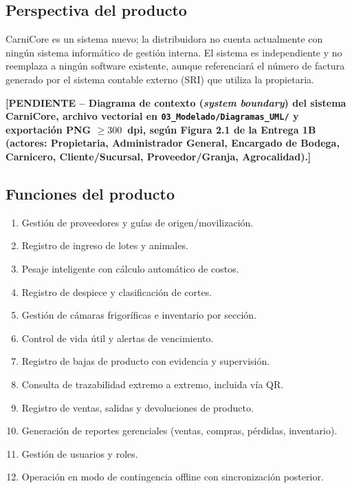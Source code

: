 \documentclass[11pt,a4paper]{article}
\newcommand{\PENDIENTE}[1]{\textcolor{pendiente}{\textbf{[PENDIENTE -- #1]}}}
\begin{document}
\subsection{Perspectiva del producto}
CarniCore es un sistema nuevo; la distribuidora no cuenta actualmente con ningún sistema informático de gestión interna. El sistema es independiente y no reemplaza a ningún software existente, aunque referenciará el número de factura generado por el sistema contable externo (SRI) que utiliza la propietaria.

\PENDIENTE{Diagrama de contexto (\textit{system boundary}) del sistema CarniCore, archivo vectorial en \texttt{03\_Modelado/Diagramas\_UML/} y exportación PNG $\geq 300$~dpi, según Figura 2.1 de la Entrega 1B (actores: Propietaria, Administrador General, Encargado de Bodega, Carnicero, Cliente/Sucursal, Proveedor/Granja, Agrocalidad).}

\subsection{Funciones del producto}
\begin{enumerate}[nosep]
\item Gestión de proveedores y guías de origen/movilización.
\item Registro de ingreso de lotes y animales.
\item Pesaje inteligente con cálculo automático de costos.
\item Registro de despiece y clasificación de cortes.
\item Gestión de cámaras frigoríficas e inventario por sección.
\item Control de vida útil y alertas de vencimiento.
\item Registro de bajas de producto con evidencia y supervisión.
\item Consulta de trazabilidad extremo a extremo, incluida vía QR.
\item Registro de ventas, salidas y devoluciones de producto.
\item Generación de reportes gerenciales (ventas, compras, pérdidas, inventario).
\item Gestión de usuarios y roles.
\item Operación en modo de contingencia offline con sincronización posterior.
\end{enumerate}
\end{document}
